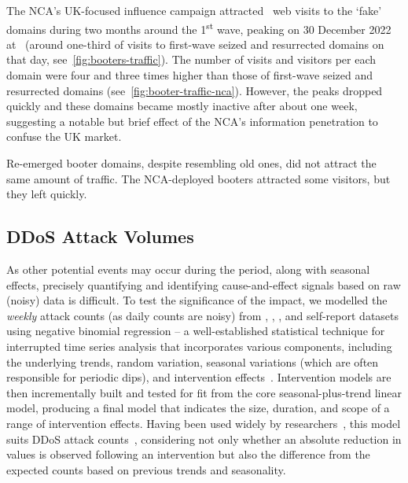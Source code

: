 \documentclass[letterpaper,twocolumn,10pt]{article}
\begin{document}
 The NCA's UK-focused influence campaign attracted \BTnTotalNCATrafficVisitsDuringTwoMonthsWeb~web visits to the `fake' domains during two months around the 1\textsuperscript{st} wave, peaking on 30 December 2022 at \BTnTotalNCATrafficVisitsDuringTwoMonthsPeakWeb~(around one-third of visits to first-wave seized and resurrected domains on that day, see~\autoref{fig:booters-traffic}). The number of visits and visitors per each domain were four and three times higher than those of first-wave seized and resurrected domains (see~\autoref{fig:booter-traffic-nca}). However, the peaks dropped quickly and these domains became mostly inactive after about one week, suggesting a notable but brief effect of the NCA's information penetration to confuse the UK market.

 Re-emerged booter domains, despite resembling old ones, did not attract the same amount of traffic. The NCA-deployed booters attracted some visitors, but they left quickly.

\subsection{DDoS Attack Volumes} \label{subsec:ddos-attack-volumes}
As other potential events may occur during the period, along with seasonal effects, precisely quantifying and identifying cause-and-effect signals based on raw (noisy) data is difficult. To test the significance of the impact, we modelled the \textit{weekly} attack counts (as daily counts are noisy) from \hopscotch, \amppot, \netscout, and self-report datasets using negative binomial regression -- a well-established statistical technique for interrupted time series analysis that incorporates various components, including the underlying trends, random variation, seasonal variations (which are often responsible for periodic dips), and intervention effects~\cite{harvey1989time}. Intervention models are then incrementally built and tested for fit from the core seasonal-plus-trend linear model, producing a final model that indicates the size, duration, and scope of a range of intervention effects. Having been used widely by researchers~\cite{braga2008policing,steinbach2015effect}, this model suits DDoS attack counts~\cite{collier2019booting}, considering not only whether an absolute reduction in values is observed following an intervention but also the difference from the expected counts based on previous trends and seasonality. 
\end{document}
